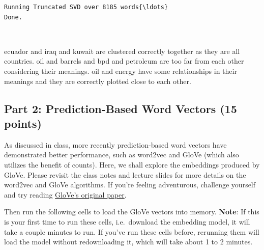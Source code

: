 \documentclass[11pt]{article}
\begin{document}
    \begin{Verbatim}[commandchars=\\\{\}]
Running Truncated SVD over 8185 words{\ldots}
Done.
    \end{Verbatim}

    \begin{center}
    \end{center}
    { \hspace*{\fill} \\}
    
    ecuador and iraq and kuwait are clustered correctly together as they are
all countries. oil and barrels and bpd and petroleum are too far from
each other considering their meanings. oil and energy have some
relationships in their meanings and they are correctly plotted close to
each other.

    \hypertarget{part-2-prediction-based-word-vectors-15-points}{%
\subsection{Part 2: Prediction-Based Word Vectors (15
points)}\label{part-2-prediction-based-word-vectors-15-points}}

As discussed in class, more recently prediction-based word vectors have
demonstrated better performance, such as word2vec and GloVe (which also
utilizes the benefit of counts). Here, we shall explore the embeddings
produced by GloVe. Please revisit the class notes and lecture slides for
more details on the word2vec and GloVe algorithms. If you're feeling
adventurous, challenge yourself and try reading
\href{https://nlp.stanford.edu/pubs/glove.pdf}{GloVe's original paper}.

Then run the following cells to load the GloVe vectors into memory.
\textbf{Note}: If this is your first time to run these cells,
i.e.~download the embedding model, it will take a couple minutes to run.
If you've run these cells before, rerunning them will load the model
without redownloading it, which will take about 1 to 2 minutes.
\end{document}
